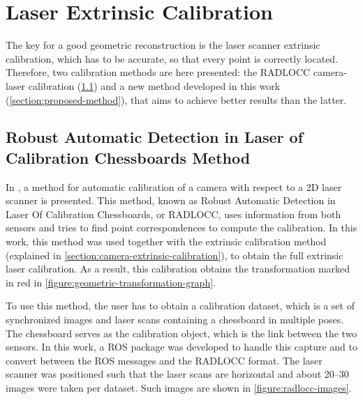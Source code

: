 \section{Laser Extrinsic Calibration}
\label{section:laser-extrinsic-calibration}

The key for a good geometric reconstruction is the laser scanner extrinsic calibration, which has to be accurate, so that every point is correctly located. Therefore, two calibration methods are here presented: the RADLOCC camera-laser calibration (\cref{section:radlocc-method}) and a new method developed in this work (\cref{section:proposed-method}), that aims to achieve better results than the latter. 

\subsection{Robust Automatic Detection in Laser of Calibration Chessboards Method}
\label{section:radlocc-method}

In \cite{zhang04}, a method for automatic calibration of a camera with respect to a 2D laser scanner is presented. This method, known as Robust Automatic Detection in Laser Of Calibration Chessboards, or RADLOCC, uses information from both sensors and tries to find point correspondences to compute the calibration. In this work, this method was used together with the extrinsic calibration method (explained in \cref{section:camera-extrinsic-calibration}), to obtain the full extrinsic laser calibration. As a result, this calibration obtains the transformation marked in red in \cref{figure:geometric-transformation-graph}.

To use this method, the user has to obtain a calibration dataset, which is a set of synchronized images and laser scans containing a chessboard in multiple poses. The chessboard serves as the calibration object, which is the link between the two sensors. In this work, a ROS package was developed to handle this capture and to convert between the ROS messages and the RADLOCC format. The laser scanner was positioned such that the laser scans are horizontal and about \numrange{20}{30} images were taken per dataset. Such images are shown in \cref{figure:radlocc-images}.


